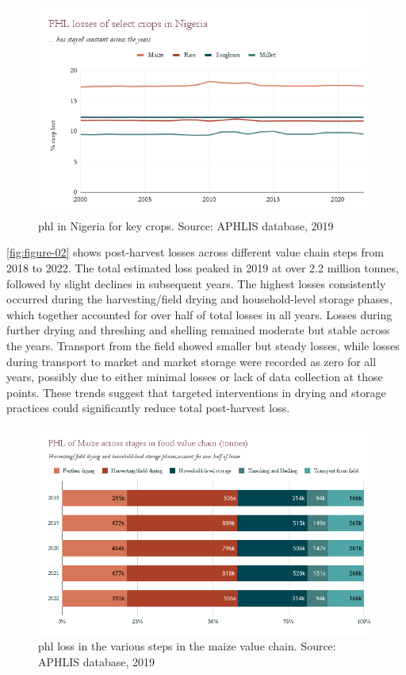 {\begin{figure}[H]
    \centering
    \includegraphics[scale=0.8]{Figures/phl_crops_v2.png}
    \caption{\acrshort{phl} in Nigeria for key crops. Source: APHLIS database, 2019}
    \label{fig:figure-01}
\end{figure}

\autoref{fig:figure-02} shows post-harvest losses across different value chain steps from 2018 to 2022. The total estimated loss peaked in 2019 at over 2.2 million tonnes, followed by slight declines in subsequent years. The highest losses consistently occurred during the harvesting/field drying and household-level storage phases, which together accounted for over half of total losses in all years.
Losses during further drying and threshing and shelling remained moderate but stable across the years. Transport from the field showed smaller but steady losses, while losses during transport to market and market storage were recorded as zero for all years, possibly due to either minimal losses or lack of data collection at those points. These trends suggest that targeted interventions in drying and storage practices could significantly reduce total post-harvest loss.

\begin{figure}[H]
    \centering
    \includegraphics[scale=0.5]{Figures/phl_across_value_chain.png}
    \caption{\acrshort{phl} loss in the various steps in the maize value chain. Source: APHLIS database, 2019}
    \label{fig:figure-02}
\end{figure}

}

